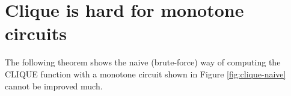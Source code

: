 % 
% 
% 
% 
% 
% 
% 
% 
% 
% 
% 
% 
% 
% 
% 
% 
% 
% 

% 

\section{Clique is hard for monotone circuits }
The following theorem shows the naive (brute-force) way of computing the CLIQUE function with a monotone circuit shown in Figure \ref{fig:clique-naive}    cannot be improved much.

